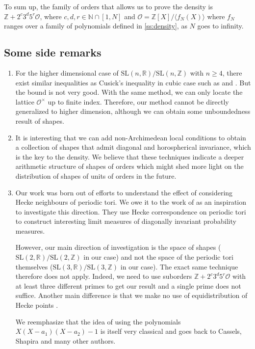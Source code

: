 \documentclass[11pt,letterpaper]{amsart}
\theoremstyle{definition}
\theoremstyle{remark}
\renewcommand{\rm}[1]{\mathrm{#1}}
\newcommand{\cal}[1]{\mathcal{#1}}
\newcommand{\bb}[1]{\mathbb{#1}}
\newcommand{\R}{\bb R}
\newcommand{\Z}{\bb Z}
\newcommand{\N}{\bb N}
\newcommand{\calO}{\cal O}
\newcommand{\SL}{\rm{SL}}
\begin{document}
{ To sum up, the family of orders that allows us to prove the density is $\Z+2^c 3^d 5^r\calO$, where $c,d,r \in \N \cap [1,N]$ and $\calO = \Z[X]/\langle f_N(X) \rangle$ where $f_N$ ranges over a family of polynomials defined in \cref{ss:density}, as $N$ goes to infinity. 
}
%
\subsection{Some side remarks}

\begin{enumerate}
    \item For the higher dimensional case of $\SL(n,\R)/\SL(n,\Z)$ with $n\geq 4$, there exist similar inequalities as Cusick's inequality in cubic case such as \cite{remakUberGrossenbeziehungenZwischen1952} and \cite{silvermanInequalityRelatingRegulator1984}. But the bound is not very good. With the same method, we can only locate the lattice $\calO^\times$ up to finite index. Therefore, our method cannot be directly generalized to higher dimension, although we can obtain some unboundedness result of shapes. 
    
    \item 
	It is interesting that we can add non-Archimedean local conditions to obtain a collection of shapes that admit diagonal and horospherical invariance, which is the key to the density. 
	We believe that these techniques indicate a deeper arithmetic structure of shapes of orders which might shed more light on the distribution of shapes of units of orders in the future.
	
	\item 
		
	{ 
	Our work was born out of efforts to understand the effect of considering Hecke neighbours of periodic tori. We owe it to the work of \cite{solan2023tori} as an inspiration
	to investigate this direction. They use Hecke correspondence on periodic tori to construct interesting limit measures of diagonally invariant probability measures.
	
	However, our main direction of investigation is the space of shapes ($\SL(2,\R)/\SL(2,\Z)$ in our case) and not the space of the periodic tori themselves ($\SL(3,\R)/\SL(3,\Z)$ in our case). The exact same technique therefore does not apply. Indeed, we need to use suborders $\Z+2^c 3^d 5^r\calO$ with at least three different primes to get our result and a single prime does not suffice. Another main difference is that we make no use of equidistribution of Hecke points \cite{clozelEQUIDISTRIBUTIONPOINTSHECKE2003}. 
	
	We reemphasize that the idea of using the polynomials $X(X-a_1)(X-a_2)-1$ is itself very classical and goes back to Cassels, Shapira and many other authors. 
	} 
	
    
\end{enumerate}
   
\end{document}

